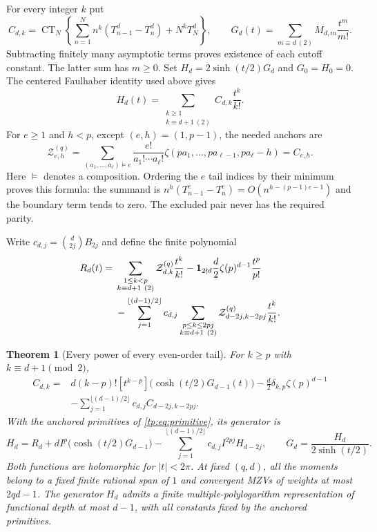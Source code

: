 \documentclass[11pt,a4paper]{article}
\numberwithin{equation}{section}
\newtheorem{theorem}{Theorem}[section]
\theoremstyle{definition}
\theoremstyle{remark}
\DeclareMathOperator{\CT}{CT}
\begin{document}
For every integer $k$ put
\[
 C_{d,k}=\CT_N\left\{\sum_{n=1}^N n^k(T_{n-1}^d-T_n^d)
                                  +N^kT_N^d\right\},\qquad
 G_d(t)=\sum_{m\equiv d\ (2)}M_{d,m}\frac{t^m}{m!}.
\]
Subtracting finitely many asymptotic terms proves existence of each
cutoff constant. The latter sum has $m\geq0$.
Set $H_d=2\sinh(t/2)G_d$ and
$G_0=H_0=0$. The centered Faulhaber identity used above gives
\begin{equation}\label{et:HC}
 H_d(t)=\sum_{\substack{k\geq1\\k\equiv d+1\ (2)}}C_{d,k}\frac{t^k}{k!}.
\end{equation}
For $e\geq1$ and $h<p$, except $(e,h)=(1,p-1)$, the needed anchors are
\begin{equation}\label{et:anchors}
 \mathcal Z^{(q)}_{e,h}=
 \sum_{(a_1,\ldots,a_\ell)\vDash e}
 \frac{e!}{a_1!\cdots a_\ell!}
 \zeta(pa_1,\ldots,pa_{\ell-1},pa_\ell-h)=C_{e,h}.
\end{equation}
Here $\vDash$ denotes a composition. Ordering the $e$ tail indices
by their minimum proves this formula: the summand is
$n^h(T_{n-1}^e-T_n^e)=O(n^{h-(p-1)e-1})$ and the boundary term
tends to zero. The excluded pair never has the required parity.

Write $c_{d,j}=\binom d{2j}B_{2j}$ and define the finite polynomial
\begin{align}\label{et:R}
 R_d(t)={}&\sum_{\substack{1\leq k<p\\k\equiv d+1\ (2)}}
       \mathcal Z^{(q)}_{d,k}\frac{t^k}{k!}
 -\mathbf1_{2\nmid d}\frac d2\zeta(p)^{d-1}\frac{t^p}{p!}\notag\\
 &-\sum_{j=1}^{\lfloor(d-1)/2\rfloor}c_{d,j}
   \sum_{\substack{p\leq k\leq2pj\\k\equiv d+1\ (2)}}
       \mathcal Z^{(q)}_{d-2j,k-2pj}\frac{t^k}{k!}.
\end{align}

\begin{theorem}[Every power of every even-order tail]\label{et:main}
For $k\geq p$ with $k\equiv d+1\pmod2$,
\begin{equation}\label{et:recurrence}
 \begin{split}
 C_{d,k}={}&d(k-p)![t^{k-p}]\bigl(\cosh(t/2)G_{d-1}(t)\bigr)
       -\frac d2\delta_{k,p}\zeta(p)^{d-1}\\
 &-\sum_{j=1}^{\lfloor(d-1)/2\rfloor}c_{d,j}C_{d-2j,k-2pj}.
 \end{split}
\end{equation}
With the anchored primitives of \eqref{tp:eq:primitive}, its generator is
\begin{equation}\label{et:generator}
 H_d=R_d+dI^p\bigl(\cosh(t/2)G_{d-1}\bigr)
        -\sum_{j=1}^{\lfloor(d-1)/2\rfloor}c_{d,j}I^{2pj}H_{d-2j},
 \qquad G_d=\frac{H_d}{2\sinh(t/2)}.
\end{equation}
Both functions are holomorphic for $|t|<2\pi$. At fixed $(q,d)$,
all the moments belong to a fixed finite rational span of $1$ and
convergent MZVs of weights at most $2qd-1$. The generator $H_d$ admits
a finite multiple-polylogarithm representation of functional depth at
most $d-1$, with all constants fixed by the anchored primitives.
\end{theorem}
\end{document}

